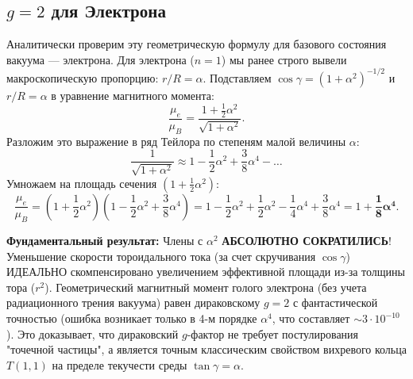 \documentclass[11pt,a4paper]{article}
\begin{document}
\subsection{$g=2$ для Электрона}
Аналитически проверим эту геометрическую формулу для базового состояния вакуума — электрона.
Для электрона ($n=1$) мы ранее строго вывели макроскопическую пропорцию: $r/R = \alpha$.
Подставляем $\cos \gamma = (1 + \alpha^2)^{-1/2}$ и $r/R = \alpha$ в уравнение магнитного момента:
\begin{equation}
	\frac{\mu_e}{\mu_B} = \frac{1 + \frac{1}{2} \alpha^2}{\sqrt{1 + \alpha^2}}.
\end{equation}
Разложим это выражение в ряд Тейлора по степеням малой величины $\alpha$:
\begin{equation}
	\frac{1}{\sqrt{1 + \alpha^2}} \approx 1 - \frac{1}{2}\alpha^2 + \frac{3}{8}\alpha^4 - \dots
\end{equation}
Умножаем на площадь сечения $(1 + \frac{1}{2}\alpha^2)$:
\begin{equation}
	\frac{\mu_e}{\mu_B} = \left( 1 + \frac{1}{2}\alpha^2 \right) \left( 1 - \frac{1}{2}\alpha^2 + \frac{3}{8}\alpha^4 \right) = 1 - \frac{1}{2}\alpha^2 + \frac{1}{2}\alpha^2 - \frac{1}{4}\alpha^4 + \frac{3}{8}\alpha^4 = 1 + \mathbf{\frac{1}{8}\alpha^4}.
\end{equation}

\textbf{Фундаментальный результат:} Члены с $\alpha^2$ \textbf{АБСОЛЮТНО СОКРАТИЛИСЬ}! 
Уменьшение скорости тороидального тока (за счет скручивания $\cos \gamma$) ИДЕАЛЬНО скомпенсировано увеличением эффективной площади из-за толщины тора ($r^2$). 
Геометрический магнитный момент голого электрона (без учета радиационного трения вакуума) равен дираковскому $g=2$ с фантастической точностью (ошибка возникает только в 4-м порядке $\alpha^4$, что составляет $\sim 3 \cdot 10^{-10}$). 
Это доказывает, что дираковский $g$-фактор не требует постулирования "точечной частицы", а является точным классическим свойством вихревого кольца $T(1,1)$ на пределе текучести среды $\tan\gamma=\alpha$.
\end{document}
